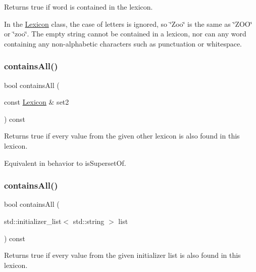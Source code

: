 Returns {\ttfamily true} if {\ttfamily word} is contained in the lexicon. 

In the {\ttfamily \mbox{\hyperlink{classLexicon}{Lexicon}}} class, the case of letters is ignored, so \char`\"{}\+Zoo\char`\"{} is the same as \char`\"{}\+Z\+O\+O\char`\"{} or \char`\"{}zoo\char`\"{}. The empty string cannot be contained in a lexicon, nor can any word containing any non-\/alphabetic characters such as punctuation or whitespace. \mbox{\label{classLexicon_a9cc56f4fc1106ca74a59fceb9d68b3e9}} 
\subsubsection{\texorpdfstring{contains\+All()}{containsAll()}\hspace{0.1cm}{\footnotesize\ttfamily [1/2]}}
{\footnotesize\ttfamily bool contains\+All (\begin{DoxyParamCaption}\item[{const \mbox{\hyperlink{classLexicon}{Lexicon}} \&}]{set2 }\end{DoxyParamCaption}) const}



Returns {\ttfamily true} if every value from the given other lexicon is also found in this lexicon. 

Equivalent in behavior to is\+Superset\+Of. \mbox{\label{classLexicon_a3934298595e72e6540e5f81d47ab763a}} 
\subsubsection{\texorpdfstring{contains\+All()}{containsAll()}\hspace{0.1cm}{\footnotesize\ttfamily [2/2]}}
{\footnotesize\ttfamily bool contains\+All (\begin{DoxyParamCaption}\item[{std\+::initializer\+\_\+list$<$ std\+::string $>$}]{list }\end{DoxyParamCaption}) const}



Returns {\ttfamily true} if every value from the given initializer list is also found in this lexicon. 

